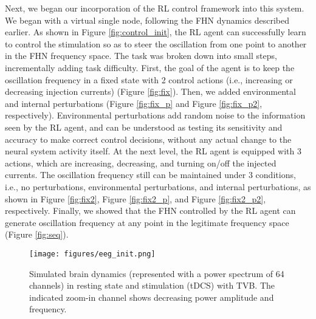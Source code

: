 \documentclass[12pt, a4paper]{article}
\begin{document}
Next, we began our incorporation of the RL control framework into this system. We began with a virtual single node, following the FHN dynamics described earlier. As shown in Figure \ref{fig:control_init}, the RL agent can successfully learn to control the stimulation so as to steer the oscillation from one point to another in the FHN frequency space. The task was broken down into small steps, incrementally adding task difficulty. First, the goal of the agent is to keep the oscillation frequency in a fixed state with 2 control actions (i.e., increasing or decreasing injection currents) (Figure \ref{fig:fix}). Then, we added environmental and internal perturbations (Figure \ref{fig:fix_p} and Figure \ref{fig:fix_p2}, respectively). Environmental perturbations add random noise to the information seen by the RL agent, and can be understood as testing its sensitivity and accuracy to make correct control decisions, without any actual change to the neural system activity itself.
At the next level, the RL agent is equipped with 3 actions, which are increasing, decreasing, and turning on/off the injected currents. The oscillation frequency still can be maintained under 3 conditions, i.e., no perturbations, environmental perturbations, and internal perturbations, as shown in Figure \ref{fig:fix2}, Figure \ref{fig:fix2_p}, and Figure \ref{fig:fix2_p2}, respectively. Finally, we showed that the FHN controlled by the RL agent can generate oscillation frequency at any point in the legitimate frequency space (Figure \ref{fig:seq}).


\begin{figure}[t] %
	\centering %
	\texttt{[image: figures/eeg\_init.png]} %
	\caption{Simulated brain dynamics (represented with a power spectrum of 64 channels) in resting state and stimulation (tDCS) with TVB. The indicated zoom-in channel shows decreasing power amplitude and frequency.} %
	\label{fig:eeg_init} %
\end{figure}
\end{document}
